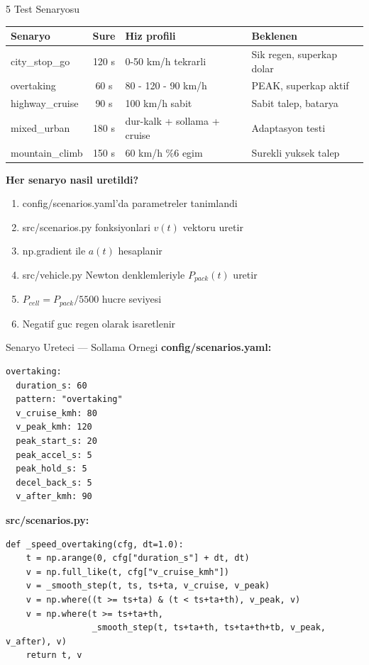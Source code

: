 \documentclass[10pt,aspectratio=169]{beamer}
\begin{document}
\begin{frame}{5 Test Senaryosu}
\begin{center}\footnotesize
\begin{tabularx}{\textwidth}{lcXX}
\toprule
Senaryo & Sure & Hiz profili & Beklenen \\
\midrule
city\_stop\_go & 120 s & 0-50 km/h tekrarli & Sik regen, superkap dolar \\
overtaking & 60 s & 80 - 120 - 90 km/h & PEAK, superkap aktif \\
highway\_cruise & 90 s & 100 km/h sabit & Sabit talep, batarya \\
mixed\_urban & 180 s & dur-kalk + sollama + cruise & Adaptasyon testi \\
mountain\_climb & 150 s & 60 km/h \%6 egim & Surekli yuksek talep \\
\bottomrule
\end{tabularx}
\end{center}

\vspace{0.3em}
\textbf{Her senaryo nasil uretildi?}
\begin{enumerate}\footnotesize
  \item config/scenarios.yaml'da parametreler tanimlandi
  \item src/scenarios.py fonksiyonlari $v(t)$ vektoru uretir
  \item np.gradient ile $a(t)$ hesaplanir
  \item src/vehicle.py Newton denklemleriyle $P_{pack}(t)$ uretir
  \item $P_{cell} = P_{pack}/5500$ hucre seviyesi
  \item Negatif guc regen olarak isaretlenir
\end{enumerate}
\end{frame}

\begin{frame}[fragile]{Senaryo Ureteci --- Sollama Ornegi}
\textbf{config/scenarios.yaml:}
\begin{lstlisting}[style=py]
overtaking:
  duration_s: 60
  pattern: "overtaking"
  v_cruise_kmh: 80
  v_peak_kmh: 120
  peak_start_s: 20
  peak_accel_s: 5
  peak_hold_s: 5
  decel_back_s: 5
  v_after_kmh: 90
\end{lstlisting}

\textbf{src/scenarios.py:}
\begin{lstlisting}[style=py]
def _speed_overtaking(cfg, dt=1.0):
    t = np.arange(0, cfg["duration_s"] + dt, dt)
    v = np.full_like(t, cfg["v_cruise_kmh"])
    v = _smooth_step(t, ts, ts+ta, v_cruise, v_peak)
    v = np.where((t >= ts+ta) & (t < ts+ta+th), v_peak, v)
    v = np.where(t >= ts+ta+th,
                 _smooth_step(t, ts+ta+th, ts+ta+th+tb, v_peak, v_after), v)
    return t, v
\end{lstlisting}
\end{frame}
\end{document}
